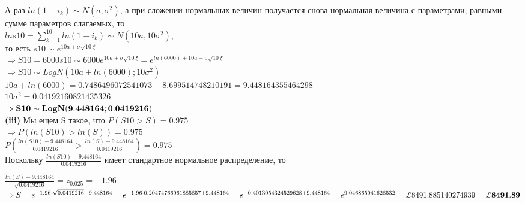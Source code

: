 \documentclass{article}
\begin{document}
А раз $ln(1+i_k) \sim  N(a,\sigma^2)$, 
а при сложении нормальных величин получается снова нормальная величина с параметрами, равными сумме параметров слагаемых, то\\

$lns10 = \sum\limits_{k=1}^{10} ln(1+i_k) \sim N(10a,10\sigma^2)$,\\

то есть $s10 \sim  e^{10a + \sigma\sqrt {10} \xi } $\\

$\Rightarrow S10= 6000s10 \sim 6000e^{10a + \sigma\sqrt {10} \xi } = e^{ln(6000)+10a + \sigma\sqrt {10} \xi}$\\


$\Rightarrow S10 \sim LogN ( 10a +ln(6000); 10\sigma^2)$\\

$10a + ln(6000) = 0.7486496072541073 + 8.699514748210191 = 9.448164355464298$\\

$10\sigma^2 = 0.04192160821435326$\\

$\Rightarrow  \bf {S10 \sim  LogN(9.448164; 0.0419216)} $\\


{\bf \large  (iii)}  Мы ещем S такое, что $P(S10>S) = 0.975$\\

$\Rightarrow P(ln(S10) > ln(S))=0.975$\\

$ P(\frac {ln(S10) - 9.448164}{0.0419216} > \frac {ln(S) - 9.448164}{0.0419216}) = 0.975$\\

Поскольку $\frac {ln(S10) - 9.448164}{0.0419216}$ имеет стандартное нормальное распределение, то 

$ \frac {ln(S) - 9.448164}{\sqrt {0.0419216}} = z_{0.025} = -1.96$\\

$\Rightarrow S = e^{-1.96 \cdot \sqrt {0.0419216} + 9.448164} =    e^{-1.96 \cdot  0.20474766961885857+ 9.448164} =  \\
e^{-0.4013054324529628+ 9.448164}  = e^{9.046865941628532} =  \pounds 8491.885140274939= \bf \pounds 8491.89$
\end{document}
